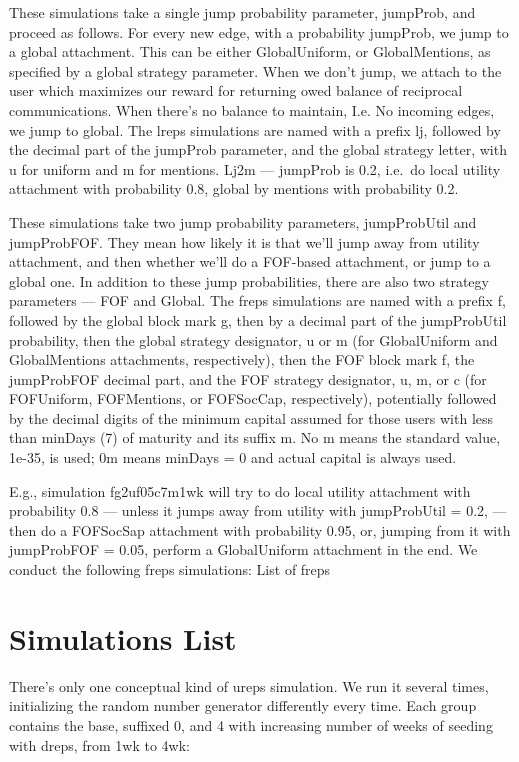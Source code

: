 \documentclass[10pt,oneside]{memoir}
\begin{document}
These simulations take a single jump probability parameter, jumpProb, and proceed as follows.  For every new edge, with a probability jumpProb, we jump to a global attachment.  This can be either GlobalUniform, or GlobalMentions, as specified by a global strategy parameter.  When we don't jump, we attach to the user which maximizes our reward for returning owed balance of reciprocal communications.  When there's no balance to maintain, I.e. No incoming edges, we jump to global.
The lreps simulations are named with a prefix lj, followed by the decimal part of the jumpProb parameter, and the global strategy letter, with u for uniform and m for mentions.
Lj2m --- jumpProb is 0.2, i.e.\ do local utility attachment with probability 0.8, global by mentions with probability 0.2.


These simulations take two jump probability parameters, jumpProbUtil and jumpProbFOF.  They mean how likely it is that we'll jump away from utility attachment, and then whether we'll do a FOF-based attachment, or jump to a global one.  In addition to these jump probabilities, there are also two strategy parameters --- FOF and Global.
The freps simulations are named with a prefix f, followed by the global block mark g, then by a decimal part of the jumpProbUtil probability, then the global strategy designator, u or m (for GlobalUniform and GlobalMentions attachments, respectively), then the FOF block mark f, the jumpProbFOF decimal part, and the FOF strategy designator, u, m, or c (for FOFUniform, FOFMentions, or FOFSocCap, respectively), potentially followed by the decimal digits of the minimum capital assumed for those users with less than minDays (7) of maturity and its suffix m.  No m means the standard value, 1e-35, is used; 0m means minDays = 0 and actual capital is always used.


E.g., simulation
fg2uf05c7m1wk  will try to do local utility attachment with probability 0.8 --- unless it jumps away from utility with jumpProbUtil = 0.2, --- then do a FOFSocSap attachment with probability 0.95, or, jumping from it with jumpProbFOF = 0.05, perform a GlobalUniform attachment in the end.
We conduct the following freps simulations:
List of freps


\pagebreak \section{Simulations List}
\label{simulationslist}

There's only one conceptual kind of ureps simulation.  We run it several times, initializing the random number generator differently every time.  Each group contains the base, suffixed 0, and 4 with increasing number of weeks of seeding with dreps, from 1wk to 4wk:
\end{document}
